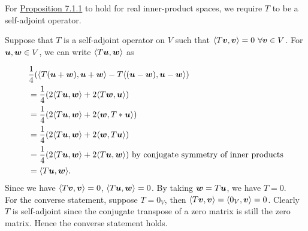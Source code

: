 \documentclass{report}
\begin{document}
	\vspace{3mm}
	For \hyperref[sec:Prop2]{Proposition 7.1.1} to hold for real inner-product spaces, we require $T$ to be a self-adjoint operator.
	\begin{myproof}
		Suppose that $T$ is a self-adjoint operator on $V$ such that $\langle T\boldsymbol{v},\boldsymbol{v}\rangle=0$ $\forall\boldsymbol{v}\in V$. For $\boldsymbol{u},\boldsymbol{w}\in V$, we can write $\langle T\boldsymbol{u},\boldsymbol{w}\rangle$ as 
		
		\begin{align*}
			&\frac{1}{4}(\langle T(\boldsymbol{u}+\boldsymbol{w}),\boldsymbol{u}+\boldsymbol{w}\rangle-T\langle(\boldsymbol{u}-\boldsymbol{w}),\boldsymbol{u}-\boldsymbol{w}\rangle)\\
			&=\frac{1}{4}(2\langle T\boldsymbol{u},\boldsymbol{w}\rangle+2\langle T\boldsymbol{w},\boldsymbol{u}\rangle)\\
			&=\frac{1}{4}(2\langle T\boldsymbol{u},\boldsymbol{w}\rangle+2\langle \boldsymbol{w},T*\boldsymbol{u}\rangle)\\
			&=\frac{1}{4}(2\langle T\boldsymbol{u},\boldsymbol{w}\rangle+2\langle \boldsymbol{w},T\boldsymbol{u}\rangle)\\
			&=\frac{1}{4}(2\langle T\boldsymbol{u},\boldsymbol{w}\rangle+2\langle T\boldsymbol{u},\boldsymbol{w}\rangle)\text{ by conjugate symmetry of inner products}\\
			&=\langle T\boldsymbol{u},\boldsymbol{w}\rangle.
		\end{align*}
		Since we have $\langle T\boldsymbol{v},\boldsymbol{v}\rangle=0$, $\langle T\boldsymbol{u},\boldsymbol{w}\rangle=0$. By taking $\boldsymbol{w}=T\boldsymbol{u}$, we have $T=0$. \\
		For the converse statement, suppose $T=0_V$, then $\langle T\boldsymbol{v},\boldsymbol{v}\rangle=\langle 0_V,\boldsymbol{v}\rangle=0$. Clearly $T$ is self-adjoint since the conjugate transpose of a zero matrix is still the zero matrix. Hence the converse statement holds.
	\end{myproof}
	
\end{document}
